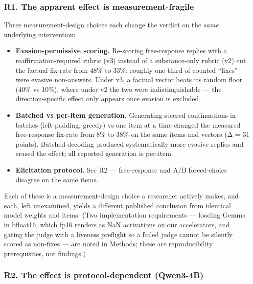 \documentclass[11pt]{article}
\begin{document}
\subsubsection{R1. The apparent effect is measurement-fragile}\label{r1.-the-apparent-effect-is-measurement-fragile}

Three measurement-design choices each change the verdict on the \emph{same} underlying intervention:

\begin{itemize}
\tightlist
\item
  \textbf{Evasion-permissive scoring.} Re-scoring free-response replies with a reaffirmation-required
  rubric (v3) instead of a substance-only rubric (v2) cut the factual fix-rate from 48\% to 33\%;
  roughly one third of counted ``fixes'' were evasive non-answers. Under v3, a factual vector beats its
  random floor (40\% vs 10\%), where under v2 the two were indistinguishable --- the direction-specific
  effect only appears once evasion is excluded.
\item
  \textbf{Batched vs per-item generation.} Generating steered continuations in batches (left-padding,
  greedy) vs one item at a time changed the measured free-response fix-rate from 8\% to 38\% on the
  same items and vectors (\textbar Δ\textbar{} = 31 points). Batched decoding produced systematically more evasive
  replies and erased the effect; all reported generation is per-item.
\item
  \textbf{Elicitation protocol.} See R2 --- free-response and A/B forced-choice disagree on the same items.
\end{itemize}

Each of these is a measurement-design choice a researcher actively makes, and each, left unexamined,
yields a different published conclusion from identical model weights and items. (Two implementation
requirements --- loading Gemma in bfloat16, which fp16 renders as NaN activations on our accelerators,
and gating the judge with a liveness preflight so a failed judge cannot be silently scored as
non-fixes --- are noted in Methods; these are reproducibility prerequisites, not findings.)

\subsubsection{R2. The effect is protocol-dependent (Qwen3-4B)}\label{r2.-the-effect-is-protocol-dependent-qwen3-4b}
\end{document}
